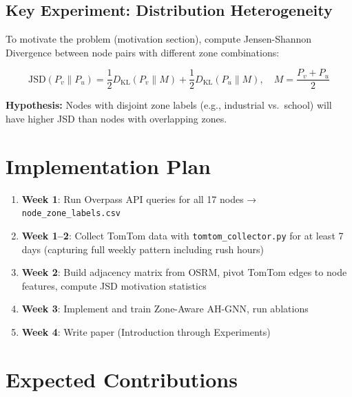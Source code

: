 \documentclass[12pt,a4paper]{article}
\begin{document}
\subsection{Key Experiment: Distribution Heterogeneity}

To motivate the problem (motivation section), compute Jensen-Shannon Divergence
between node pairs with different zone combinations:

\begin{equation}
\text{JSD}(P_v \| P_u) = \frac{1}{2} D_{\text{KL}}(P_v \| M) + \frac{1}{2} D_{\text{KL}}(P_u \| M),
\quad M = \frac{P_v + P_u}{2}
\end{equation}

\textbf{Hypothesis:} Nodes with disjoint zone labels (e.g., industrial vs.\ school)
will have higher JSD than nodes with overlapping zones.

\section{Implementation Plan}

\begin{enumerate}
    \item \textbf{Week 1}: Run Overpass API queries for all 17 nodes → \texttt{node\_zone\_labels.csv}
    \item \textbf{Week 1--2}: Collect TomTom data with \texttt{tomtom\_collector.py}
          for at least 7 days (capturing full weekly pattern including rush hours)
    \item \textbf{Week 2}: Build adjacency matrix from OSRM, pivot TomTom edges to
          node features, compute JSD motivation statistics
    \item \textbf{Week 3}: Implement and train Zone-Aware AH-GNN, run ablations
    \item \textbf{Week 4}: Write paper (Introduction through Experiments)
\end{enumerate}

\section{Expected Contributions}
\end{document}
